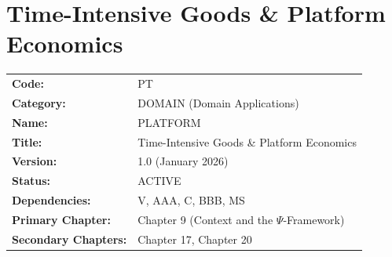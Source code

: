 %
%

%
%
%
%

\chapter{Time-Intensive Goods \& Platform Economics}
\label{app:platform-economics}


\begin{tcolorbox}[colback=gray!5!white, colframe=gray!75!black,
    title=Appendix Metadata]
\begin{tabular}{@{}ll@{}}
\textbf{Code:} & PT \\
\textbf{Category:} & DOMAIN (Domain Applications) \\
\textbf{Name:} & PLATFORM \\
\textbf{Title:} & Time-Intensive Goods \& Platform Economics \\
\textbf{Version:} & 1.0 (January 2026) \\
\textbf{Status:} & ACTIVE \\
\textbf{Dependencies:} & V, AAA, C, BBB, MS \\
\textbf{Primary Chapter:} & Chapter 9 (Context and the $\Psi$-Framework) \\
\textbf{Secondary Chapters:} & Chapter 17, Chapter 20 \\
\end{tabular}
\end{tcolorbox}

